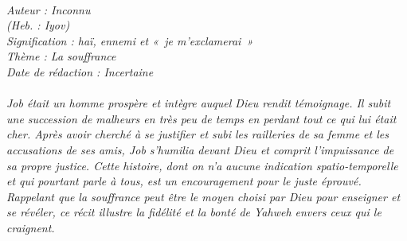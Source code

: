 \BFont
\noindent\hrulefill
{\footnotesize
\textit{
\bigskip
{\centering{}
\\Auteur : Inconnu
\\(Heb. : Iyov)
\\Signification : haï, ennemi et  «~je m'exclamerai~»
\\Thème : La souffrance
\\Date de rédaction : Incertaine\\}
}
\textit{
\\Job était un homme prospère et intègre auquel Dieu rendit témoignage. Il subit une succession de malheurs en très peu de temps en perdant tout ce qui lui était cher. Après avoir cherché à se justifier et subi les railleries de sa femme et les accusations de ses amis, Job s’humilia devant Dieu et comprit l’impuissance de sa propre justice. Cette histoire, dont on n’a aucune indication spatio-temporelle et qui pourtant parle à tous, est un encouragement pour le juste éprouvé.
\\Rappelant que la souffrance peut être le moyen choisi par Dieu pour enseigner et se révéler, ce récit illustre la fidélité et la bonté de Yahweh envers ceux qui le craignent.\bigskip
}
}
\par\nobreak\noindent\hrulefill

